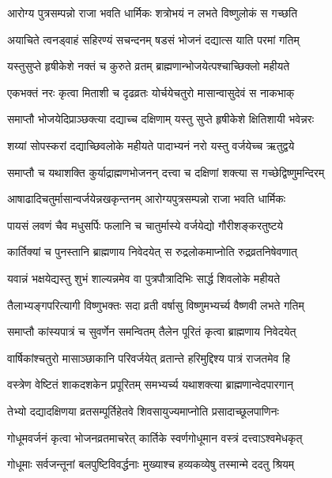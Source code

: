 \twolineshloka
{आरोग्य पुत्रसम्पन्नो राजा भवति धार्मिकः}
{शत्रोभयं न लभते विष्णुलोकं स गच्छति} %

\twolineshloka
{अयाचिते त्वनड्वाहं सहिरण्यं सचन्दनम्}
{षडसं भोजनं दद्यात्स याति परमां गतिम्} %

\twolineshloka
{यस्तुसुप्ते हृषीकेशे नक्तं च कुरुते व्रतम्}
{ब्राह्मणान्भोजयेत्पश्चाच्छिक्लो महीयते} %

\twolineshloka
{एकभक्तं नरः कृत्वा मिताशी च दृढव्रतः}
{योर्चयेचतुरो मासान्वासुदेवं स नाकभाक्} %

\twolineshloka
{समाप्तौ भोजयेदिप्राञ्छक्त्या दद्याच्च दक्षिणाम्}
{यस्तु सुप्ते हृषीकेशे क्षितिशायी भवेन्नरः} %

\twolineshloka
{शय्यां सोपस्करां दद्याच्छिवलोके महीयते}
{पादाभ्यनं नरो यस्तु वर्जयेच्च ऋतुद्वये} %

\twolineshloka
{समाप्तौ च यथाशक्ति कुर्याद्राह्मणभोजनन्}
{दत्त्वा च दक्षिणां शक्त्या स गच्छेद्विष्णुमन्दिरम्} %

\twolineshloka
{आषाढादिचतुर्मासान्वर्जयेन्नखकृन्तनम्}
{आरोग्यपुत्रसम्पन्नो राजा भवति धार्मिकः} %

\twolineshloka
{पायसं लवणं चैव मधुसर्पिः फलानि च}
{चातुर्मास्ये वर्जयेद्यो गौरीशङ्करतुष्टये} %

\twolineshloka
{कार्तिक्यां च पुनस्तानि ब्राह्मणाय निवेदयेत्}
{स रुद्रलोकमाप्नोति रुद्रव्रतनिषेवणात्} %

\twolineshloka
{यवान्नं भक्षयेद्यस्तु शुभं शाल्यन्नमेव वा}
{पुत्रपौत्रादिभिः सार्द्ध शिवलोके महीयते} %

\twolineshloka
{तैलाभ्यङ्गपरित्यागी विष्णुभक्तः सदा व्रती}
{वर्षासु विष्णुमभ्यर्च्य वैष्णवी लभते गतिम्} %

\twolineshloka
{समाप्तौ कांस्यपात्रं च सुवर्णेन समन्वितम्}
{तैलेन पूरितं कृत्वा ब्राह्मणाय निवेदयेत्} %

\twolineshloka
{वार्षिकांश्चतुरो मासाञ्छाकानि परिवर्जयेत्}
{व्रतान्ते हरिमुद्दिश्य पात्रं राजतमेव हि} %

\twolineshloka
{वस्त्रेण वेष्टितं शाकदशकेन प्रपूरितम्}
{समभ्यर्च्य यथाशक्त्या ब्राह्मणान्वेदपारगान्} %

\twolineshloka
{तेभ्यो दद्यादक्षिणया व्रतसम्पूर्तिहेतवे}
{शिवसायुज्यमाप्नोति प्रसादाच्छूलपाणिनः} %

\twolineshloka
{गोधूमवर्जनं कृत्वा भोजनव्रतमाचरेत्}
{कार्तिके स्वर्णगोधूमान वस्त्रं दत्त्वाऽश्वमेधकृत्} %

\twolineshloka
{गोधूमाः सर्वजन्तूनां बलपुष्टिविवर्द्धनाः}
{मुख्याश्च हव्यकव्येषु तस्मान्मे ददतु श्रियम्} %


